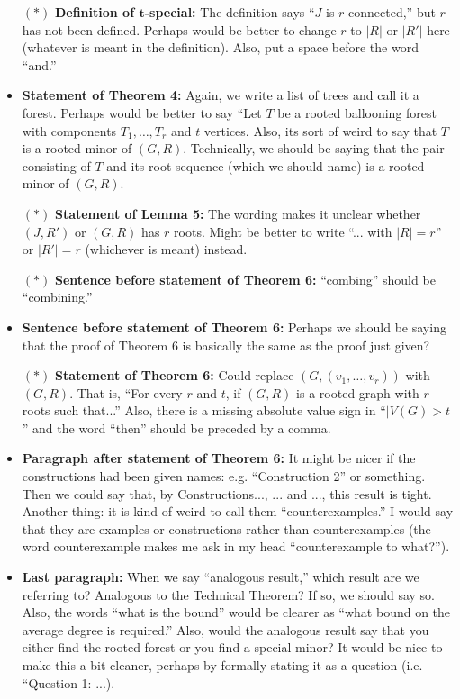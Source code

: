 \documentclass[11 pt]{article}
\theoremstyle{definition}
\theoremstyle{case}
\numberwithin{equation}{section}
\begin{document}
\begin{itemize}
\item[$\boldsymbol{(*)}$] \textbf{Definition of $\boldsymbol{t}$-special:} The definition says ``$J$ is $r$-connected,'' but $r$ has not been defined. Perhaps would be better to change $r$ to $|R|$ or $|R'|$ here (whatever is meant in the definition). Also, put a space before the word ``and.''
\item \textbf{Statement of Theorem 4:} Again, we write a list of trees and call it a forest. Perhaps would be better to say ``Let $T$ be a rooted ballooning forest with components $T_1,\dots, T_r$ and $t$ vertices. Also, its sort of weird to say that $T$ is a rooted minor of $(G,R)$. Technically, we should be saying that the pair consisting of $T$ and its root sequence (which we should name) is a rooted minor of $(G,R)$.
\item[$\boldsymbol{(*)}$] \textbf{Statement of Lemma 5:} The wording makes it unclear whether $(J,R')$ or $(G,R)$ has $r$ roots. Might be better to write ``... with $|R|=r$'' or $|R'|=r$ (whichever is meant) instead.
\item[$\boldsymbol{(*)}$] \textbf{Sentence before statement of Theorem 6:} ``combing'' should be ``combining.''
\item \textbf{Sentence before statement of Theorem 6:} Perhaps we should be saying that the proof of Theorem 6 is basically the same as the proof just given? 
\item[$\boldsymbol{(*)}$] \textbf{Statement of Theorem 6:} Could replace $(G,(v_1,\dots,v_r))$ with $(G,R)$. That is, ``For every $r$ and $t$, if $(G,R)$ is a rooted graph with $r$ roots such that...'' Also, there is a missing absolute value sign in ``$|V(G) > t$'' and the word ``then'' should be preceded by a comma.
\item \textbf{Paragraph after statement of Theorem 6:} It might be nicer if the constructions had been given names: e.g. ``Construction 2'' or something. Then we could say that, by Constructions..., ... and ..., this result is tight. Another thing: it is kind of weird to call them ``counterexamples.'' I would say that they are examples or constructions rather than counterexamples (the word counterexample makes me ask in my head ``counterexample to what?'').
\item \textbf{Last paragraph:} When we say ``analogous result,'' which result are we referring to? Analogous to the Technical Theorem? If so, we should say so. Also, the words ``what is the bound'' would be clearer as ``what bound on the average degree is required.'' Also, would the analogous result say that you either find the rooted forest or you find a special minor? It would be nice to make this a bit cleaner, perhaps by formally stating it as a question (i.e. ``Question 1: ...).
\end{itemize}
\end{document}
